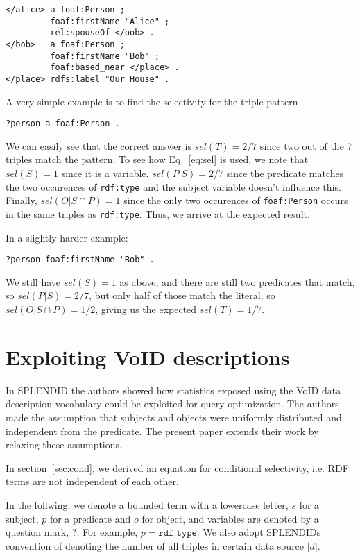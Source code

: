 \documentclass[12pt, draft]{article}
\newcommand{\rdfterm}[1]{\texttt{#1}}
\newcommand{\sel}[1]{\ensuremath{sel\left(#1\right)}}
\begin{document}
\begin{verbatim}
</alice> a foaf:Person ;
         foaf:firstName "Alice" ;
         rel:spouseOf </bob> .
</bob>   a foaf:Person ;
         foaf:firstName "Bob" ;
         foaf:based_near </place> .
</place> rdfs:label "Our House" .
\end{verbatim}

A very simple example is to find the selectivity for the triple pattern
\begin{verbatim}
?person a foaf:Person .
\end{verbatim}
We can easily see that the correct answer is $\sel{T} = 2/7$ since two
out of the 7 triples match the pattern. To see how Eq.~\ref{eq:sel} is
used, we note that $\sel{S} = 1$ since it is a variable. $\sel{P | S} =
2/7$ since the predicate matches the two occurences of
\rdfterm{rdf:type} and the subject variable doesn't influence
this. Finally, $\sel{O | S \cap P} = 1$ since the only two occurences
of \rdfterm{foaf:Person} occurs in the same triples as
\rdfterm{rdf:type}. Thus, we arrive at the expected result.

In a slightly harder example:
\begin{verbatim}
?person foaf:firstName "Bob" .
\end{verbatim}
We still have $\sel{S} = 1$ as above, and there are still two
predicates that match, so $\sel{P | S} = 2/7$, but only half of those
match the literal, so $\sel{O | S \cap P} = 1/2$, giving us the
expected $\sel{T} = 1/7$.

\section{Exploiting VoID descriptions}

In SPLENDID\cite{splendid} the authors showed how statistics exposed
using the VoID data description vocabulary\cite{void} could be
exploited for query optimization. The authors made the assumption that
subjects and objects were uniformly distributed and independent from
the predicate. The present paper extends their work by relaxing these
assumptions.

In section~\ref{sec:cond}, we derived an equation for conditional
selectivity, i.e. RDF terms are not independent of each
other.
 
In the follwing, we denote a bounded term with a lowercase letter, $s$
for a subject, $p$ for a predicate and $o$ for object, and variables
are denoted by a question mark, $?$. For example, $p =
\rdfterm{rdf:type}$. We also adopt SPLENDIDs convention of denoting
the number of all triples in certain data source $|d|$.
\end{document}
